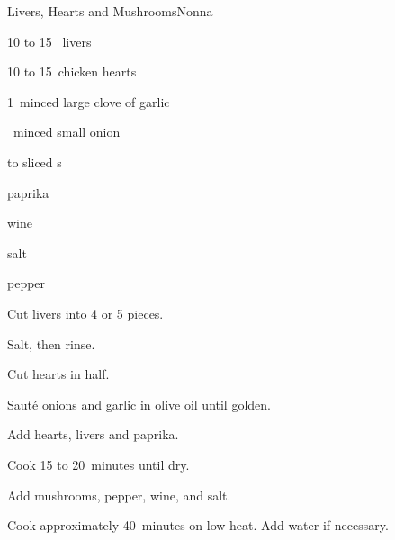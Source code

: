 \begin{recipe}{Livers, Hearts and Mushrooms}{Nonna}{}

\begin{ingredients}
\item 10 to 15~ livers
\item 10 to 15~chicken hearts
\item 1~minced large clove of garlic
\item \half{}~minced small onion
\item \threequarter{} to  sliced s
\item \tp{\half} paprika
\item wine
\item salt
\item pepper
\end{ingredients}

\begin{directions}
\item Cut livers into 4 or 5 pieces.
\item Salt, then rinse.
\item Cut hearts in half.
\item Saut\'e onions and garlic in olive oil until golden.
\item Add hearts, livers and paprika.
\item Cook 15 to 20~minutes until dry.
\item Add mushrooms, pepper, wine, and salt.
\item Cook approximately 40~minutes on low heat. Add water if necessary.
\end{directions}

\end{recipe}
